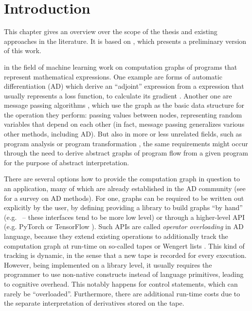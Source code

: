\chapter{Introduction}
\label{cha:introduction}

This chapter gives an overview over the scope of the thesis and existing approaches in the
literature.  It is based on \textcite{gabler2019graph}, which presents a preliminary version of this
work.

 in the field of machine learning work on computation graphs of programs
that represent mathematical expressions.  One example are forms of automatic differentiation (AD)
which derive an \enquote{adjoint} expression from a expression that usually represents a loss
function, to calculate its gradient \parencite{griewank2008evaluating, gebremedhin2020introduction}.
Another one are message passing algorithms \parencite{minka2005divergence}, which use the graph as
the basic data structure for the operation they perform: passing values between nodes, representing
random variables that depend on each other (in fact, message passing generalizes various other
methods, including AD).  But also in more or less unrelated fields, such as program analysis or
program transformation \parencite[cf.][]{muchnick1997advanced,singer2018static,aho1986compilers},
the same requirements might occur through the need to derive abstract graphs of program flow from a
given program for the purpose of abstract interpretation.

There are several options how to provide the computation graph in question to an application, many
of which are already established in the AD community (see \textcite{baydin2018automatic} for a
survey on AD methods).  For one, graphs can be required to be written out explicitly by the user,
by defining providing a library to build graphs \enquote{by hand}
(e.g. \textcite{chewxy2020gorgonia,jia2014caffe}~-- these interfaces tend to be more low level) or
through a higher-level API (e.g. PyTorch \parencite{paszke2017automatic} or TensorFlow
\parencite{abadi2015tensorflow}).  Such APIs are called \emph{operator overloading} in AD language,
because they extend existing operations to additionally track the computation graph at run-time on
so-called tapes or Wengert lists \parencite{bartholomew-biggs2000automatic}.  This kind of tracking
is dynamic, in the sense that a new tape is recorded for every execution.  However, being
implemented on a library level, it usually requires the programmer to use non-native constructs
instead of language primitives, leading to cognitive overhead.  This notably happens for control
statements, which can rarely be \enquote{overloaded}.  Furthermore, there are additional run-time
costs due to the separate interpretation of derivatives stored on the tape.

